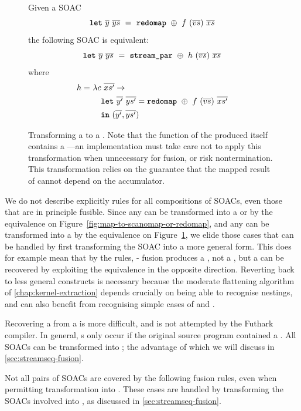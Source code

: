 \begin{figure}[bt]
  Given a SOAC
\[
  \mbox{\texttt{\bfseries{let}}}~\overline{y}~\overline{ys}~=~\mbox{\texttt{\bfseries{redomap}}}~\oplus~f~(\overline{vs})~\overline{xs}
\]
the following SOAC is equivalent:
\[
  \mbox{\texttt{\bfseries{let}}}~\overline{y}~\overline{ys}~=~\mbox{\texttt{\bfseries{stream\_par}}}~\oplus~h~(\overline{vs})~\overline{xs}
\]
where \begin{align*}
        h =~& \lambda c~\overline{xs'} \rightarrow \\
            & \quad \mbox{\texttt{\bfseries{let}}}~\overline{y'}~\overline{ys'} = \mbox{\texttt{\bfseries{redomap}}}~\oplus~f~(\overline{vs})~\overline{xs'} \\
            & \quad \mbox{\texttt{\bfseries{in}}}~(\overline{y'}, \overline{ys'})
  \end{align*}
  \caption{Transforming a  to a \StreamPar.  Note that the
    function of the produced \StreamPar{} itself contains a
    ---an implementation must take care not to apply this
    transformation when unnecessary for fusion, or risk
    nontermination.  This transformation relies on the guarantee that
    the mapped result of  cannot depend on the accumulator.}
  \label{fig:redomap-to-streamred}
\end{figure}

We do not describe explicitly rules for all compositions of SOACs,
even those that are in principle fusible.  Since any  can be
transformed into a  or  by the equivalence on
Figure~\ref{fig:map-to-scanomap-or-redomap}, and any  can
be transformed into a \StreamPar{} by the equivalence on
Figure~\ref{fig:redomap-to-streamred}, we elide those cases that can
be handled by first transforming the SOAC into a more general form.
This does for example mean that by the rules, - fusion
produces a , not a , but a  can be
recovered by exploiting the equivalence in the opposite direction.
Reverting back to less general constructs is necessary because the
moderate flattening algorithm of \cref{chap:kernel-extraction} depends
crucially on being able to recognise  nestings, and can also
benefit from recognising simple cases of  and .

Recovering a  from a \StreamPar{} is more difficult, and is
not attempted by the Futhark compiler.  In general, \StreamPar{}s only
occur if the original source program contained a \StreamRed{}.  All
SOACs can be transformed into \StreamSeq; the advantage of which we
will discuss in \cref{sec:streamseq-fusion}.

Not all pairs of SOACs are covered by the following fusion rules, even
when permitting transformation into \StreamPar{}.  These cases are
handled by transforming the SOACs involved into \StreamSeq{}, as
discussed in \cref{sec:streamseq-fusion}.

